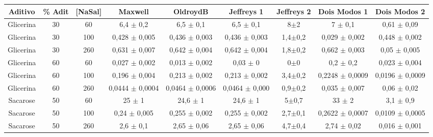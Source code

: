 	\begin{table}[h]
		\begin{adjustbox}{angle=90}
	{%
		\begin{tabular}{c c c | c c c c c c}
			\toprule
			 Aditivo  &\% Adit & [NaSal]      & Maxwell                & OldroydB                & Jeffreys 1                & Jeffreys 2    & Dois Modos 1               & Dois Modos 2               \\ \midrule
			Glicerina & 30         & 60       & 6,4     \(\pm\) 0,2    & 6,5      \(\pm\) 0,1    & 6,5       \(\pm\) 0,1     & 8\(\pm\)2     & 7           \(\pm\) 0,1    & 0,61        \(\pm\) 0,09   \\
			Glicerina & 30         & 100      & 0,428   \(\pm\) 0,005  & 0,436    \(\pm\) 0,003  & 0,436     \(\pm\) 0,003   & 1,4\(\pm\)0,2 & 0,029       \(\pm\) 0,002  & 0,448       \(\pm\) 0,002  \\
			Glicerina & 30         & 260      & 0,631   \(\pm\) 0,007  & 0,642    \(\pm\) 0,004  & 0,642     \(\pm\) 0,004   & 1,8\(\pm\)0,2 & 0,662       \(\pm\) 0,003  & 0,05        \(\pm\) 0,005  \\
			Glicerina & 60         & 60       & 0,027   \(\pm\) 0,002  & 0,013    \(\pm\) 0,002  & 0,03      \(\pm\) 0       & 0\(\pm\)0     & 0,2         \(\pm\) 0,2    & 0,023       \(\pm\) 0,004  \\
			Glicerina & 60         & 100      & 0,196   \(\pm\) 0,004  & 0,213    \(\pm\) 0,002  & 0,213     \(\pm\) 0,002   & 3,4\(\pm\)0,2 & 0,2248      \(\pm\) 0,0009 & 0,0196      \(\pm\) 0,0009 \\
			Glicerina & 60         & 260      & 0,0444  \(\pm\) 0,0004 & 0,0464   \(\pm\) 0,0006 & 0,0464    \(\pm\) 0,000   & 0,9\(\pm\)0,2 & 0,035       \(\pm\) 0,007  & 0,06        \(\pm\) 0,02   \\
			Sacarose  & 50         & 60       & 25      \(\pm\) 1      & 24,6     \(\pm\) 1      & 24,6      \(\pm\) 1       & 5\(\pm\)0,7   & 33          \(\pm\) 2      & 3,1         \(\pm\) 0,9    \\
			Sacarose  & 50         & 100      & 0,24    \(\pm\) 0,005  & 0,255    \(\pm\) 0,002  & 0,255     \(\pm\) 0,002   & 2,7\(\pm\)0,1 & 0,2622      \(\pm\) 0,0007 & 0,0109      \(\pm\) 0,0005 \\
			Sacarose  & 50         & 260      & 2,6     \(\pm\) 0,1    & 2,65     \(\pm\) 0,06   & 2,65      \(\pm\) 0,06    & 4,7\(\pm\)0,4 & 2,74        \(\pm\) 0,02   & 0,016       \(\pm\) 0,001  \\ \midrule

\end{tabular}}
\end{adjustbox}
\end{table}
